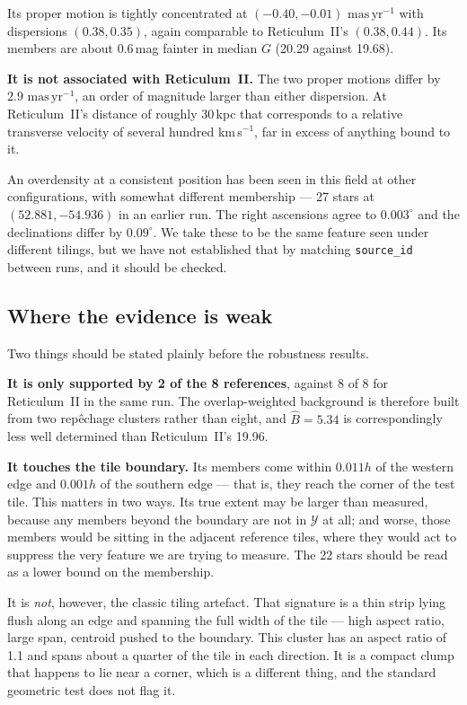\documentclass[11pt,a4paper]{article}
\newcommand{\unit}[1]{\ensuremath{\,\mathrm{#1}}}
\newcommand{\masyr}{\unit{mas\,yr^{-1}}}
\newcommand{\Ycal}{\mathcal{Y}}              %
\newcommand{\Bhat}{\hat{B}}
\newcommand{\Ycal}{\mathcal{Y}}
\newcommand{\masyr}{\mathrm{mas\,yr^{-1}}}
\newcommand{\dg}{^{\circ}}
\begin{document}
Its proper motion is tightly concentrated at $(-0.40, -0.01)\,\masyr$ with dispersions
$(0.38, 0.35)$, again comparable to Reticulum~II's $(0.38, 0.44)$. Its members are about 0.6\,mag
fainter in median $G$ (20.29 against 19.68).

\textbf{It is not associated with Reticulum~II.} The two proper motions differ by
$2.9\,\masyr$, an order of magnitude larger than either dispersion. At Reticulum~II's distance of
roughly 30\,kpc that corresponds to a relative transverse velocity of several hundred
km\,s$^{-1}$, far in excess of anything bound to it.

An overdensity at a consistent position has been seen in this field at other configurations, with
somewhat different membership --- 27 stars at $(52.881, -54.936)$ in an earlier run. The right
ascensions agree to $0.003\dg$ and the declinations differ by $0.09\dg$. We take these to be the
same feature seen under different tilings, but we have not established that by matching
\texttt{source\_id} between runs, and it should be checked.

\subsection{Where the evidence is weak}

Two things should be stated plainly before the robustness results.

\textbf{It is only supported by 2 of the 8 references}, against 8 of 8 for Reticulum~II in the same
run. The overlap-weighted background is therefore built from two rep\^echage clusters rather than
eight, and $\Bhat = 5.34$ is correspondingly less well determined than Reticulum~II's 19.96.

\textbf{It touches the tile boundary.} Its members come within $0.011h$ of the western edge and
$0.001h$ of the southern edge --- that is, they reach the corner of the test tile. This matters in
two ways. Its true extent may be larger than measured, because any members beyond the boundary are
not in $\Ycal$ at all; and worse, those members would be sitting in the adjacent reference tiles,
where they would act to suppress the very feature we are trying to measure. The 22 stars should be
read as a lower bound on the membership.

It is \emph{not}, however, the classic tiling artefact. That signature is a thin strip lying flush
along an edge and spanning the full width of the tile --- high aspect ratio, large span, centroid
pushed to the boundary. This cluster has an aspect ratio of 1.1 and spans about a quarter of the
tile in each direction. It is a compact clump that happens to lie near a corner, which is a
different thing, and the standard geometric test does not flag it.
\end{document}
